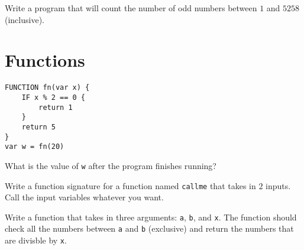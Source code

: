 \documentclass{article}
\begin{document}
\begin{Exercise}

Write a program that will count the number of odd numbers between $1$ and $5258$ (inclusive).

\end{Exercise}

\section{Functions}
\setcounter{Exercise}{0}

\begin{Exercise}
\begin{lstlisting}[caption={Pseudocode.}, label={code:exercise_fn_1},mathescape]
FUNCTION fn(var x) {
    IF x % 2 == 0 {
        return 1
    }
    return 5
}
var w = fn(20)
\end{lstlisting}

What is the value of \lstinline{w} after the program finishes running?

\end{Exercise}

\begin{Exercise}

Write a function signature for a function named \lstinline{callme} that takes in $2$ inputs.
Call the input variables whatever you want.

\end{Exercise}

\begin{Exercise}

Write a function that takes in three arguments: \lstinline{a}, \lstinline{b}, and \lstinline{x}.
The function should check all the numbers between \lstinline{a} and \lstinline{b} (exclusive) and return the numbers that are divisble by \lstinline{x}.

\end{Exercise}
\end{document}
